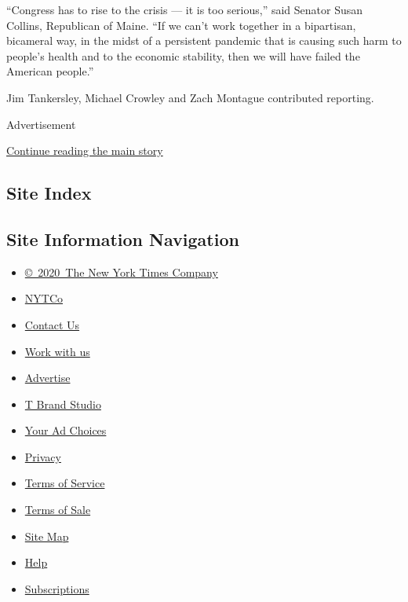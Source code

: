 ``Congress has to rise to the crisis --- it is too serious,'' said
Senator Susan Collins, Republican of Maine. ``If we can't work together
in a bipartisan, bicameral way, in the midst of a persistent pandemic
that is causing such harm to people's health and to the economic
stability, then we will have failed the American people.''

Jim Tankersley, Michael Crowley and Zach Montague contributed reporting.

Advertisement

\protect\hyperlink{after-bottom}{Continue reading the main story}

\hypertarget{site-index}{%
\subsection{Site Index}\label{site-index}}

\hypertarget{site-information-navigation}{%
\subsection{Site Information
Navigation}\label{site-information-navigation}}

\begin{itemize}
\tightlist
\item
  \href{https://help.nytimes3xbfgragh.onion/hc/en-us/articles/115014792127-Copyright-notice}{©~2020~The
  New York Times Company}
\end{itemize}

\begin{itemize}
\tightlist
\item
  \href{https://www.nytco.com/}{NYTCo}
\item
  \href{https://help.nytimes3xbfgragh.onion/hc/en-us/articles/115015385887-Contact-Us}{Contact
  Us}
\item
  \href{https://www.nytco.com/careers/}{Work with us}
\item
  \href{https://nytmediakit.com/}{Advertise}
\item
  \href{http://www.tbrandstudio.com/}{T Brand Studio}
\item
  \href{https://www.nytimes3xbfgragh.onion/privacy/cookie-policy\#how-do-i-manage-trackers}{Your
  Ad Choices}
\item
  \href{https://www.nytimes3xbfgragh.onion/privacy}{Privacy}
\item
  \href{https://help.nytimes3xbfgragh.onion/hc/en-us/articles/115014893428-Terms-of-service}{Terms
  of Service}
\item
  \href{https://help.nytimes3xbfgragh.onion/hc/en-us/articles/115014893968-Terms-of-sale}{Terms
  of Sale}
\item
  \href{https://spiderbites.nytimes3xbfgragh.onion}{Site Map}
\item
  \href{https://help.nytimes3xbfgragh.onion/hc/en-us}{Help}
\item
  \href{https://www.nytimes3xbfgragh.onion/subscription?campaignId=37WXW}{Subscriptions}
\end{itemize}
